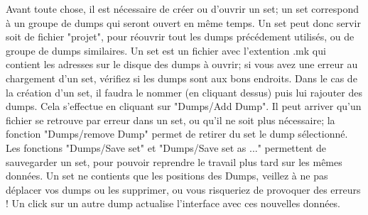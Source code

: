 Avant toute chose, il est nécessaire de créer ou d'ouvrir un set; un set correspond à un groupe de dumps qui seront ouvert en même temps.
Un set peut donc servir soit de fichier "projet", pour réouvrir tout les dumps précédement utilisés, ou de groupe de dumps similaires.
Un set est un fichier avec l'extention .mk qui contient les adresses sur le disque des dumps à ouvrir; si vous avez une erreur au chargement d'un set, vérifiez si les dumps sont aux bons endroits.
Dans le cas de la création d'un set, il faudra le nommer (en cliquant dessus) puis lui rajouter des dumps. Cela s'effectue en cliquant sur "Dumps/Add Dump".
Il peut arriver qu'un fichier se retrouve par erreur dans un set, ou qu'il ne soit plus nécessaire; la fonction "Dumps/remove Dump" permet de retirer du set le dump sélectionné.
Les fonctions "Dumps/Save set" et "Dumps/Save set as ..." permettent de sauvegarder un set, pour pouvoir reprendre le travail plus tard sur les mêmes données. Un set ne contients que les positions des Dumps, veillez à ne pas déplacer vos dumps ou les supprimer, ou vous risqueriez de provoquer des erreurs !
Un click sur un autre dump actualise l'interface avec ces nouvelles données.